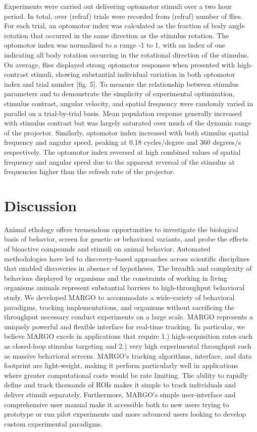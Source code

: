\documentclass[10pt]{article}
\begin{document}
\begin{multicols}{2}
Experiments were carried out delivering optomotor stimuli over a two hour period. In total, over (refraf) trials were recorded from (refraf) number of flies. For each trial, an optomotor index was calculated as the fraction of body angle rotation that occurred in the same direction as the stimulus rotation. The optomotor index was normalized to a range -1 to 1, with an index of one indicating all body rotation occurring in the rotational direction of the stimulus. On average, flies displayed strong optomotor responses when presented with high-contrast stimuli, showing substantial individual variation in both optomotor index and trial number [fig. 5]. To measure the relationship between stimulus parameters and to demonstrate the simplicity of experimental optimization, stimulus contrast, angular velocity, and spatial frequency were randomly varied in parallel on a trial-by-trial basis. Mean population response generally increased with stimulus contrast but was largely saturated over much of the dynamic range of the projector. Similarly, optomotor index increased with both stimulus spatial frequency and angular speed, peaking at 0.18 cycles/degree and 360 degrees/s respectively. The optomotor index reversed at high combined values of spatial frequency and angular speed due to the apparent reversal of the stimulus at frequencies higher than the refresh rate of the projector.


\section{Discussion}

Animal ethology offers tremendous opportunities to investigate the biological basis of behavior, screen for genetic or behavioral variants, and probe the effects of bioactive compounds and stimuli on animal behavior. Automated methodologies have led to discovery-based approaches across scientific disciplines that enabled discoveries in absence of hypotheses. The breadth and complexity of behaviors displayed by organisms and the constraints of working in living organisms animals represent substantial barriers to high-throughput behavioral study. We developed MARGO to accommodate a wide-variety of behavioral paradigms, tracking implementations, and organisms without sacrificing the throughput necessary conduct experiments on a large scale. MARGO represents a uniquely powerful and flexible interface for real-time tracking. In particular, we believe MARGO excels in applications that require 1.) high-acquisition rates such as closed-loop stimulus targeting and 2.) very high experimental throughput such as massive behavioral screens. MARGO's tracking algorithms, interface, and data footprint are light-weight, making it perform particularly well in applications where greater computational costs would be rate limiting. The ability to rapidly define and track thousands of ROIs makes it simple to track individuals and deliver stimuli separately. Furthermore, MARGO's simple user-interface and comprehensive user manual make it accessible both to new users trying to prototype or run pilot experiments and more advanced users looking to develop custom experimental paradigms.


\end{multicols}
\end{document}

